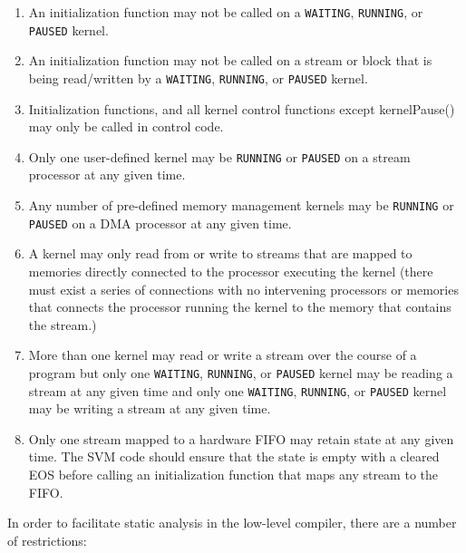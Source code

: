 \begin{enumerate}

\item An initialization function may not be called on a {\tt WAITING}, {\tt RUNNING}, or {\tt PAUSED} kernel.

\item An initialization function may not be called on a stream or block that is being read/written by a {\tt WAITING}, {\tt RUNNING}, or {\tt PAUSED} kernel.

\item Initialization functions, and all kernel control functions except kernelPause() may only be called in control code.

\item Only one user-defined kernel may be {\tt RUNNING} or {\tt PAUSED} on a stream processor at any given time.

\item Any number of pre-defined memory management kernels may be {\tt RUNNING} or {\tt PAUSED} on a DMA processor at any given time.

\item A kernel may only read from or write to streams that are mapped to memories directly connected to the processor executing the kernel (there must exist a series of connections with no intervening processors or memories that connects the processor running the kernel to the memory that contains the stream.)

\item More than one kernel may read or write a stream over the course of a program but only one {\tt WAITING}, {\tt RUNNING}, or {\tt PAUSED} kernel may be reading a stream at any given time and only one {\tt WAITING}, {\tt RUNNING}, or {\tt PAUSED} kernel may be writing a stream at any given time. 

\item Only one stream mapped to a hardware FIFO may retain state at any given time. The SVM code should ensure that the state is empty with a cleared EOS before calling an initialization function that maps any stream to the FIFO.

\end{enumerate}

In order to facilitate static analysis in the
low-level compiler, there are a number of restrictions:

